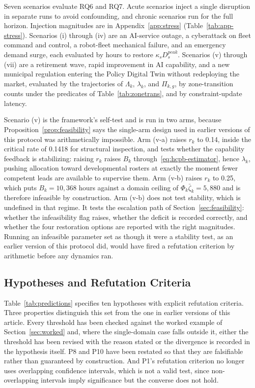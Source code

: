 	Seven scenarios evaluate RQ6 and RQ7. Acute scenarios inject a single disruption in separate runs to avoid confounding, and chronic scenarios run for the full horizon. Injection magnitudes are in Appendix~\ref{app:stress} (Table~\ref{tab:app-stress}). Scenarios (i) through (iv) are an AI-service outage, a cyberattack on fleet command and control, a robot-fleet mechanical failure, and an emergency demand surge, each evaluated by hours to restore $\kappa_s D^{peak}_s$. Scenarios (v) through (vii) are a retirement wave, rapid improvement in AI capability, and a new municipal regulation entering the Policy Digital Twin without redeploying the market, evaluated by the trajectories of $\Lambda_k$, $\lambda_k$, and $\Pi_{k,g}$, by zone-transition counts under the predicates of Table~\ref{tab:zonetrans}, and by constraint-update latency.
	
	Scenario (v) is the framework's self-test and is run in two arms, because Proposition~\ref{prop:feasibility} says the single-arm design used in earlier versions of this protocol was arithmetically impossible. Arm (v-a) raises $r_k$ to 0.14, inside the critical rate of 0.1418 for structural inspection, and tests whether the capability feedback is stabilizing: raising $r_k$ raises $B_k$ through~\eqref{eq:hcpb-estimator}, hence $\lambda_k$, pushing allocation toward developmental rosters at exactly the moment fewer competent leads are available to supervise them. Arm (v-b) raises $r_k$ to 0.25, which puts $B_k = 10{,}368$ hours against a domain ceiling of $\Phi_k\bar\zeta_k = 5{,}880$ and is therefore infeasible by construction. Arm (v-b) does not test stability, which is undefined in that regime. It tests the escalation path of Section~\ref{sec:feasibility}: whether the infeasibility flag raises, whether the deficit is recorded correctly, and whether the four restoration options are reported with the right magnitudes. Running an infeasible parameter set as though it were a stability test, as an earlier version of this protocol did, would have fired a refutation criterion by arithmetic before any dynamics ran.
	
	\subsection{Hypotheses and Refutation Criteria}
	\label{sec:predictions}
	
	Table~\ref{tab:predictions} specifies ten hypotheses with explicit refutation criteria. Three properties distinguish this set from the one in earlier versions of this article. Every threshold has been checked against the worked example of Section~\ref{sec:worked} and, where the single-domain case falls outside it, either the threshold has been revised with the reason stated or the divergence is recorded in the hypothesis itself. P8 and P10 have been restated so that they are falsifiable rather than guaranteed by construction. And P1's refutation criterion no longer uses overlapping confidence intervals, which is not a valid test, since non-overlapping intervals imply significance but the converse does not hold.
	
